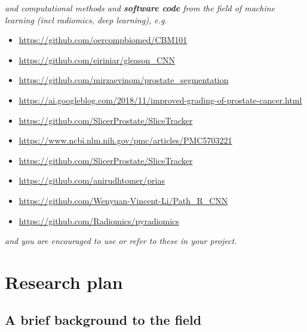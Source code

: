 \documentclass[11pt]{article}
\begin{document}
\begin{scriptsize}
{\it and  computational methods and {\bf software code} from the field of machine learning (incl radiomics, deep learning), e.g.}

\begin{center}
\begin{itemize}
    \item \url{https://github.com/oercompbiomed/CBM101}
    \item \url{https://github.com/eiriniar/gleason_CNN}
    \item \url{https://github.com/mirzaevinom/prostate_segmentation}
    \item \url{https://ai.googleblog.com/2018/11/improved-grading-of-prostate-cancer.html}
    \item \url{https://github.com/SlicerProstate/SliceTracker}
    \item \url{https://www.ncbi.nlm.nih.gov/pmc/articles/PMC5703221}
    \item \url{https://github.com/SlicerProstate/SliceTracker}
    \item \url{https://github.com/anirudhtomer/prias}
    \item \url{https://github.com/Wenyuan-Vincent-Li/Path_R_CNN}
    \item \url{https://github.com/Radiomics/pyradiomics}
\end{itemize}
\end{center}


 {\it and you are encouraged to use or refer to these in your project.}\\
 

\end{scriptsize}


\section{Research plan} %

\vspace{3mm}

\subsection{A brief background to the field}
\end{document}
